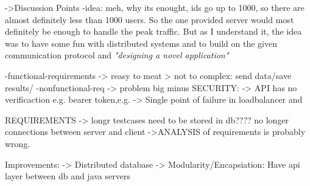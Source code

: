 \documentclass{article}
\begin{document}
->Discussion Points
-idea: meh, why its enought, ids go up to 1000, so there are almost definitely less than 1000 users. So the one provided server would most definitely be enough to handle the peak traffic. But as I understand it, the idea was to have some fun with distributed systems and to build on the given communication protocol and \textit{"designing a novel application"}\cite{ds_4} 


-functional-requirements -> reasy to meat > not to complex: send data/save results/
-nonfunctional-req -> problem
big minus SECURITY:
-> API has no verificaction e.g. bearer token,e.g.
-> Single point of failure in loadbalancer and 

REQUIREMENTS
-> longr testcases need to be stored in db???? no longer connections between server and client
->ANALYSIS of requirements is probably wrong.

Improvements:
-> Distributed database 
-> Modularity/Encapsiation: Have api layer between db and java servers

\printbibliography[heading=bibintoc]
\end{document}

